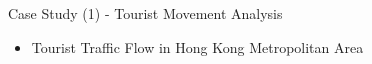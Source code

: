 \documentclass[
 size=14pt,
 paper=smartboard,  %
 mode=present, 		%
 display=slides, 	%
 style=tuliplab,  	%
 pauseslide,
 fleqn,leqno]{powerdot}{}
\begin{document}
\begin{slide}[toc=,bm=]{Case Study (1) - Tourist Movement Analysis}

\begin{itemize}
  \item Tourist Traffic Flow in Hong Kong Metropolitan Area
\end{itemize}

\begin{figure}[htbp]
\end{figure}


\footnotesize{}

\end{slide}
\end{document}
